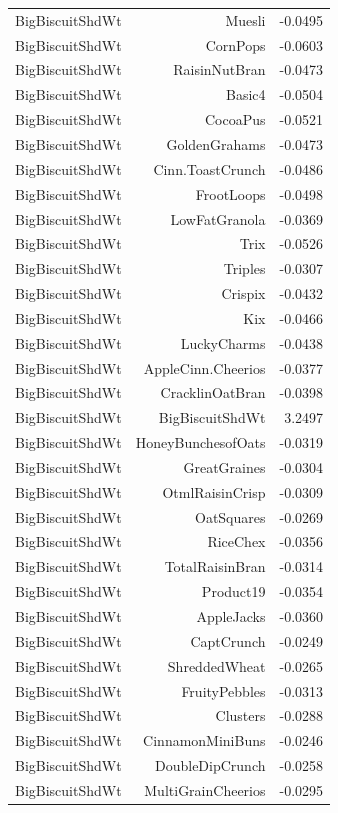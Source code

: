 \begin{longtable}{@{}lrr@{}}
BigBiscuitShdWt & Muesli & -0.0495 \\
BigBiscuitShdWt & CornPops & -0.0603 \\
BigBiscuitShdWt & RaisinNutBran & -0.0473 \\
BigBiscuitShdWt & Basic4 & -0.0504 \\
BigBiscuitShdWt & CocoaPus & -0.0521 \\
BigBiscuitShdWt & GoldenGrahams & -0.0473 \\
BigBiscuitShdWt & Cinn.ToastCrunch & -0.0486 \\
BigBiscuitShdWt & FrootLoops & -0.0498 \\
BigBiscuitShdWt & LowFatGranola & -0.0369 \\
BigBiscuitShdWt & Trix & -0.0526 \\
BigBiscuitShdWt & Triples & -0.0307 \\
BigBiscuitShdWt & Crispix & -0.0432 \\
BigBiscuitShdWt & Kix & -0.0466 \\
BigBiscuitShdWt & LuckyCharms & -0.0438 \\
BigBiscuitShdWt & AppleCinn.Cheerios & -0.0377 \\
BigBiscuitShdWt & CracklinOatBran & -0.0398 \\
BigBiscuitShdWt & BigBiscuitShdWt & 3.2497 \\
BigBiscuitShdWt & HoneyBunchesofOats & -0.0319 \\
BigBiscuitShdWt & GreatGraines & -0.0304 \\
BigBiscuitShdWt & OtmlRaisinCrisp & -0.0309 \\
BigBiscuitShdWt & OatSquares & -0.0269 \\
BigBiscuitShdWt & RiceChex & -0.0356 \\
BigBiscuitShdWt & TotalRaisinBran & -0.0314 \\
BigBiscuitShdWt & Product19 & -0.0354 \\
BigBiscuitShdWt & AppleJacks & -0.0360 \\
BigBiscuitShdWt & CaptCrunch & -0.0249 \\
BigBiscuitShdWt & ShreddedWheat & -0.0265 \\
BigBiscuitShdWt & FruityPebbles & -0.0313 \\
BigBiscuitShdWt & Clusters & -0.0288 \\
BigBiscuitShdWt & CinnamonMiniBuns & -0.0246 \\
BigBiscuitShdWt & DoubleDipCrunch & -0.0258 \\
BigBiscuitShdWt & MultiGrainCheerios & -0.0295 \\

\end{longtable}
